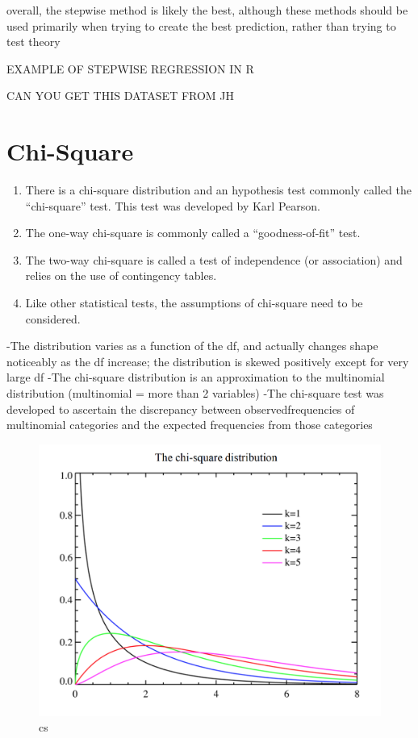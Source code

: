 \documentclass[]{book}
\providecommand{\tightlist}{%
  \setlength{\itemsep}{0pt}\setlength{\parskip}{0pt}}
\theoremstyle{definition}
\theoremstyle{definition}
\theoremstyle{definition}
\theoremstyle{remark}
\begin{document}
overall, the stepwise method is likely the best, although these methods
should be used primarily when trying to create the best prediction,
rather than trying to test theory

EXAMPLE OF STEPWISE REGRESSION IN R

CAN YOU GET THIS DATASET FROM JH

\chapter{Chi-Square}\label{chi-square}

\begin{enumerate}
\def\labelenumi{\arabic{enumi}.}
\tightlist
\item
  There is a chi-square distribution and an hypothesis test commonly
  called the ``chi-square'' test. This test was developed by Karl
  Pearson.
\item
  The one-way chi-square is commonly called a ``goodness-of-fit'' test.
\item
  The two-way chi-square is called a test of independence (or
  association) and relies on the use of contingency tables.
\item
  Like other statistical tests, the assumptions of chi-square need to be
  considered.
\end{enumerate}

-The distribution varies as a function of the df, and actually changes
shape noticeably as the df increase; the distribution is skewed
positively except for very large df -The chi-square distribution is an
approximation to the multinomial distribution (multinomial = more than 2
variables) -The chi-square test was developed to ascertain the
discrepancy between observedfrequencies of multinomial categories and
the expected frequencies from those categories

\begin{figure}
\centering
\includegraphics{img/hickscs1.png}
\caption{cs}
\end{figure}
\end{document}
